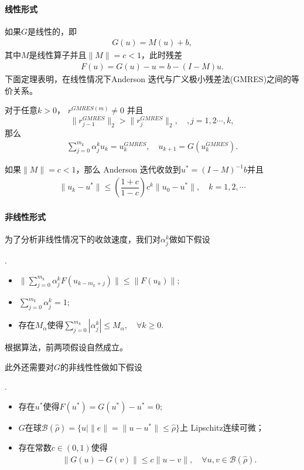 	
	\paragraph{线性形式} 如果$ G $是线性的，即
	\begin{align*}
	G(u) = M(u) + b ,
	\end{align*}
	其中$ M $是线性算子并且$ \|M\|=c<1 $，此时残差
	\begin{align*}
	F(u) = G(u) -u = b - (I-M)u.
	\end{align*}
	下面定理表明，在线性情况下Anderson 迭代与广义极小残差法(GMRES)之间的等价关系。
	\begin{theorem}
		对于任意$ k>0 $， $ r^{GMRES(m)} \neq 0$ 并且$$ \|r_{j-1}^{GMRES}\|_2> \|r_{j}^{GMRES}\|_2, \quad,j=1,2\cdots,k,$$ 那么
		\begin{align*}
		\sum_{j=0}^{m_k}\alpha^k_ju_k = u_k^{GMRES},\quad u_{k+1} = G(u_k^{GMRES}).
		\end{align*}
	\end{theorem}

	\begin{theorem}
		如果$ \|M\| = c<1 $，那么 Anderson 迭代收敛到$ u^* = (I-M)^{-1}b $并且
		\begin{align*}
		\|u_k - u^*\| \leq \left(\dfrac{1+c}{1-c}\right)c^k \|u_0 - u^*\|,\quad k = 1,2,\cdots
		\end{align*}
	\end{theorem}

	\paragraph{非线性形式} 
	为了分析非线性情况下的收敛速度，我们对$ \alpha_j^k $做如下假设
	\begin{assumption}.
		\label{assm:alpha}
		\begin{itemize}
			\item $ \|\sum_{j=0}^{m_k}\alpha_j^kF(u_{k-m_k+j})\| \leq \|F(u_k)\|; $
			\item $ \sum_{j=0}^{m_k}\alpha_j^k = 1; $
			\item 	存在$M_\alpha  $使得$
			\sum_{j=0}^{m_k}|\alpha_j^k| \leq M_\alpha,\quad \forall k\geq 0.$
		\end{itemize}		
	\end{assumption}
	根据算法，前两项假设自然成立。

	此外还需要对$ G$的非线性性做如下假设
	\begin{assumption}.
		\label{assm:G}
		\begin{itemize}
			\item 存在$ u^* $使得$ F(u^*) =G(u^*) - u^* = 0; $
			\item $ G $在球$ \mathcal{B}(\hat{\rho}) = \{u|\|e\| = \|u-u^*\| \leq \hat{\rho}\} $上 Lipschitz连续可微；
			\item 存在常数$ c\in(0,1) $使得
			\begin{align*}
			\|G(u) - G(v)\|\leq c\|u - v\|,\quad \forall u,v\in\mathcal{B}(\hat{\rho}).
			\end{align*}
		\end{itemize}
	\end{assumption}

